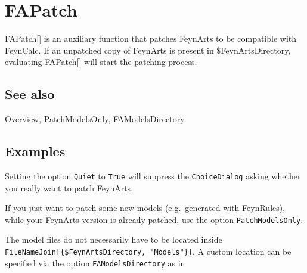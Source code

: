 \documentclass[../FeynCalcManual.tex]{subfiles}
\begin{document}
\hypertarget{fapatch}{
\section{FAPatch}\label{fapatch}}

FAPatch{[}{]} is an auxiliary function that patches FeynArts to be
compatible with FeynCalc. If an unpatched copy of FeynArts is present in
\$FeynArtsDirectory, evaluating FAPatch{[}{]} will start the patching
process.

\subsection{See also}

\hyperlink{toc}{Overview}, \hyperlink{patchmodelsonly}{PatchModelsOnly},
\hyperlink{famodelsdirectory}{FAModelsDirectory}.

\subsection{Examples}

Setting the option \texttt{Quiet} to \texttt{True} will suppress the
\texttt{ChoiceDialog} asking whether you really want to patch FeynArts.

\begin{Shaded}
\begin{Highlighting}[]
\end{Highlighting}
\end{Shaded}

If you just want to patch some new models (e.g.~generated with
FeynRules), while your FeynArts version is already patched, use the
option \texttt{PatchModelsOnly}.

\begin{Shaded}
\begin{Highlighting}[]
\end{Highlighting}
\end{Shaded}

The model files do not necessarily have to be located inside
\texttt{FileNameJoin[\allowbreak{}\{\allowbreak{}\$FeynArtsDirectory,\ \allowbreak{}"Models"\}]}.
A custom location can be specified via the option
\texttt{FAModelsDirectory} as in

\begin{Shaded}
\begin{Highlighting}[]
\CommentTok{(*FAPatch[PatchModelsOnly{-}\textgreater{}True,FAModelsDirectory{-}\textgreater{}}
\CommentTok{FileNameJoin[\{ParentDirectory@NotebookDirectory[],"FeynArts","MyModel"\}]]*)}
\end{Highlighting}
\end{Shaded}
\end{document}
